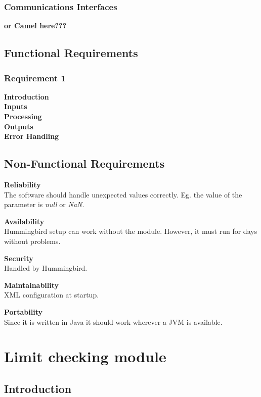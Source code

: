 \subsubsection{Communications Interfaces}

\textbf{or Camel here???}


\subsection{Functional Requirements}

\subsubsection{Requirement 1}

\textbf{Introduction}\\
\textbf{Inputs}\\
\textbf{Processing}\\
\textbf{Outputs}\\
\textbf{Error Handling}\\

\subsection{Non-Functional Requirements}

\textbf{Reliability}\\
The software should handle unexpected values correctly. Eg. the value of the parameter is \emph{null} or \emph{NaN}.

\textbf{Availability}\\
Hummingbird setup can work without the module. However, it must run for days without problems.

\textbf{Security}\\
Handled by Hummingbird.

\textbf{Maintainability}\\
XML configuration at startup.

\textbf{Portability}\\
Since it is written in Java it should work wherever a JVM is available.

\section{Limit checking module}

\subsection{Introduction}


